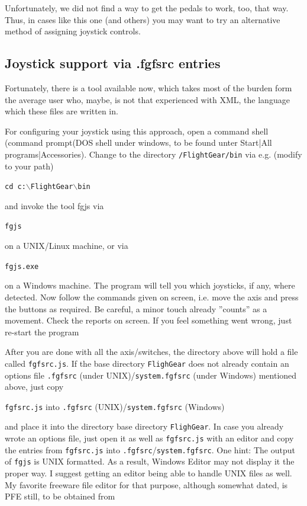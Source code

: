 Unfortunately, we did not find a way to get the pedals to work, too, that way. Thus, in cases like this one (and others) you may want to try an alternative method of assigning joystick controls.


\subsection{Joystick support via .fgfsrc entries\label{fgfsrcjoy}}
Fortunately, there is a tool available now, which takes most of the burden form the average user who, maybe, is not that experienced with XML, the language which these files are written in.

For configuring your joystick using this approach, open a command shell (command prompt(DOS shell under windows, to be found unter Start|All programs|Accessories). Change to the directory \texttt{/FlightGear/bin} via e.g. (modify to your path) 

\noindent
\texttt{cd c:$\backslash$FlightGear$\backslash$bin}

and invoke the tool fgjs via

\noindent
\texttt{fgjs}

on a UNIX/Linux machine, or via

\noindent
\texttt{fgjs.exe}

on a Windows machine. The program will tell you which joysticks, if any, where detected. Now follow the commands given on screen, i.e. move the axis and press the buttons as required. Be careful, a minor touch already ''counts'' as a movement. Check the reports on screen. If you feel something went wrong, just re-start the program

After you are done with all the axis/switches, the directory above will hold a file called \texttt{fgfsrc.js}. If the \FlightGear{} base directory \texttt{FlighGear} does not already contain an options file \texttt{.fgfsrc} (under UNIX)/\texttt{system.fgfsrc} (under Windows) mentioned above, just copy
\medskip

\noindent
 \texttt{fgfsrc.js} into \texttt{.fgfsrc} (UNIX)/\texttt{system.fgfsrc} (Windows) 
 \medskip

\noindent 
and place it into the directory \FlightGear{} base directory \texttt{FlighGear}. In case you already wrote an options file, just open it as well as \texttt{fgfsrc.js} with an editor and copy the entries from \texttt{fgfsrc.js} into \texttt{.fgfsrc}/\texttt{system.fgfsrc}. One hint: The output of \texttt{fgjs} is UNIX formatted. As a result, Windows Editor may not display it the proper way. I suggest getting an editor being able to handle UNIX files as well. My favorite freeware file editor for that purpose, although somewhat dated, is PFE still, to be obtained from

